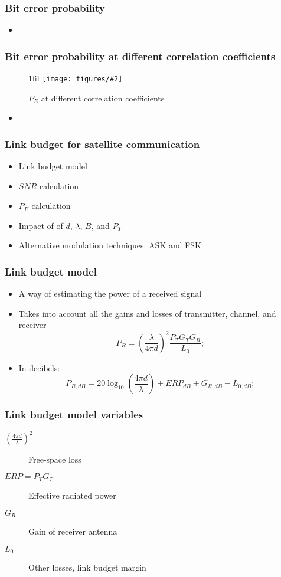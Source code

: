 \documentclass{beamer}
\makeatletter
\newcommand*{\centerfloat}{%
  \parindent \z@
  \leftskip \z@ \@plus 1fil \@minus \textwidth
  \rightskip\leftskip
  \parfillskip \z@skip}
\newcommand{\fig}[3]{
  \begin{figure}[H]
  \centerfloat
    \texttt{[image: figures/\#2]}
	\caption{#3}
  \end{figure}
}
\makeatother
\begin{document}
\begin{frame}
	\frametitle{Bit error probability}
	\begin{itemize}
		\item
	\end{itemize}
\end{frame}

\begin{frame}
	\frametitle{Bit error probability at different correlation coefficients}
	\fig{4cm}{pe_r12.png}{$P_E$ at different correlation coefficients}
	\begin{itemize}
		\item
	\end{itemize}
\end{frame}





\begin{frame}
	\frametitle{Link budget for satellite communication}
	\begin{itemize}
		\item Link budget model
		\item $SNR$ calculation
		\item $P_E$ calculation
		\item Impact of of $d$, $\lambda$, $B$, and $P_T$
		\item Alternative modulation techniques: ASK and FSK
	\end{itemize}
\end{frame}

\begin{frame}
	\frametitle{Link budget model}
	\begin{itemize}
		\item A way of estimating the power of a received signal
		\item Takes into account all the gains and losses of transmitter, channel, and receiver
		\begin{equation}
			P_R = \left(\frac{\lambda}{4 \pi d}\right)^2 \frac{P_T G_T G_R}{L_0};
		\end{equation}
		\item In decibels:
		\begin{equation}
			P_{R, dB} = 20\log_{10}\left(\frac{4 \pi d}{\lambda}\right) + {ERP}_{dB} + G_{R, dB} - L_{0, dB};
		\end{equation}
	\end{itemize}
\end{frame}

\begin{frame}
	\frametitle{Link budget model variables}
	\begin{description}
		\item[$(\frac{4 \pi d}{\lambda})^2$] Free-space loss
		\item[$ERP = P_T G_T$] Effective radiated power
		\item[$G_R$] Gain of receiver antenna
		\item[$L_0$] Other losses, link budget margin
	\end{description}
\end{frame}
\end{document}
